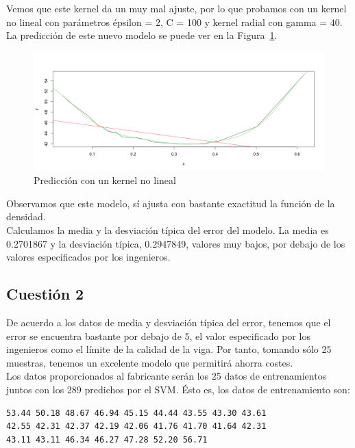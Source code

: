 \documentclass[12pt,a4paper,twoside,openright,titlepage,final]{article}
\begin{document}
Vemos que este kernel da un muy mal ajuste, por lo que probamos con un kernel no lineal con parámetros épsilon = 2, C = 100 y kernel radial con gamma = 40. La predicción de este nuevo modelo se puede ver en la Figura~\ref{fig:plot_kernel_no_lineal}.\\

\begin{figure}
\centering
\includegraphics[width=0.8\linewidth]{imagenes/plot_kernel_no_lineal}
\caption{Predicción con un kernel no lineal}
\label{fig:plot_kernel_no_lineal}
\end{figure}

Observamos que este modelo, sí ajusta con bastante exactitud la función de la densidad.\\

Calculamos la media y la desviación típica del error del modelo. La media es 0.2701867 y la desviación típica, 0.2947849, valores muy bajos, por debajo de los valores especificados por los ingenieros.

\subsection{Cuestión 2}

De acuerdo a los datos de media y desviación típica del error, tenemos que el error se encuentra bastante por debajo de 5, el valor especificado por los ingenieros como el límite de la calidad de la viga. Por tanto, tomando sólo 25 muestras, tenemos un excelente modelo que permitirá ahorra costes.\\

Los datos proporcionados al fabricante serán los 25 datos de entrenamientos juntos con los 289 predichos por el SVM. Ésto es, los datos de entrenamiento son:

\begin{verbatim}
53.44 50.18 48.67 46.94 45.15 44.44 43.55 43.30 43.61 
42.55 42.31 42.37 42.19 42.06 41.76 41.70 41.64 42.31 
43.11 43.11 46.34 46.27 47.28 52.20 56.71
\end{verbatim}
\end{document}
